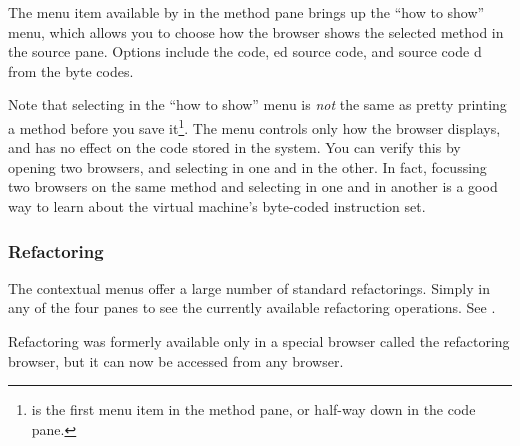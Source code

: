 \documentclass[a4paper,10pt,twoside]{book}
\begin{document}
The  menu item available by  in the method pane brings up the ``how to show'' menu, which allows you to choose how the browser shows the selected method in the source pane.  Options include the  code, ed source code,  and source code d from the byte codes.

Note that selecting  in the ``how to show'' menu is \emph{not} the same as pretty printing a method before you save it\footnote{ is the first menu item in the method pane, or half-way down in the code pane.}.  
The menu controls only how the browser displays, and has no effect on the code stored in the system.  
You can verify this  by opening two browsers, and selecting  in one and  in the other.   
In fact, focussing two browsers on the same method and selecting  in one and  in another is a good way to learn about the \pharo virtual machine's byte-coded instruction set.

\subsubsection{Refactoring}

The contextual menus offer a large number of standard refactorings.
Simply \actclick in any of the four panes to see the currently available refactoring operations.
See .

Refactoring was formerly available only in a special browser called the refactoring browser, but it can now be accessed from any browser.
\end{document}
